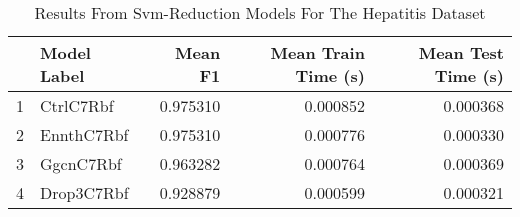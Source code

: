 \begin{table}
\centering
\caption{Results From Svm-Reduction Models For The Hepatitis Dataset}
\label{tab:svm_reduction_results_hepatitis}
\begin{tabular}{rlrrr}
\toprule
 & Model Label & Mean F1 & Mean Train Time (s) & Mean Test Time (s) \\
\midrule
1 & CtrlC7Rbf & 0.975310 & 0.000852 & 0.000368 \\
2 & EnnthC7Rbf & 0.975310 & 0.000776 & 0.000330 \\
3 & GgcnC7Rbf & 0.963282 & 0.000764 & 0.000369 \\
4 & Drop3C7Rbf & 0.928879 & 0.000599 & 0.000321 \\
\bottomrule
\end{tabular}
\end{table}
